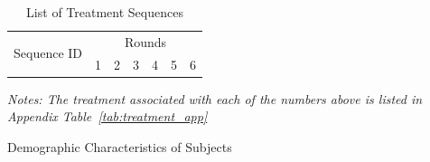 \documentclass[12pt,a4paper]{article}
\begin{document}
\begin{appendices}
\begin{table}[h!]
\centering
\begin{threeparttable}[h!]
\caption{List of Treatment Sequences} \label{tab:treatseq_app}
\begin{tabular}{ccccccc}
\toprule
\multirow{2}{10ex}{\centering Sequence ID} & \multicolumn{6}{c}{Rounds} \\ \cmidrule(lr){2-7}
   & 1 & 2 & 3 & 4 & 5 & 6 \\
\midrule

\bottomrule
\end{tabular}
\begin{tablenotes}[flushleft]
\item\footnotesize \textit{Notes: The treatment associated with each of the numbers above is listed in Appendix Table~\ref{tab:treatment_app}}
\end{tablenotes}
\end{threeparttable}
\end{table}

\newpage\clearpage

\begin{table}[h!]
\centering
\caption{Demographic Characteristics of Subjects} \label{summ_tab}
	
\end{table}


\begin{table}[H]\centering
\caption{Average Protection by Signal Type and Prior}
\label{tab:nonparIP_A}
\end{table}
\end{appendices}
\end{document}
